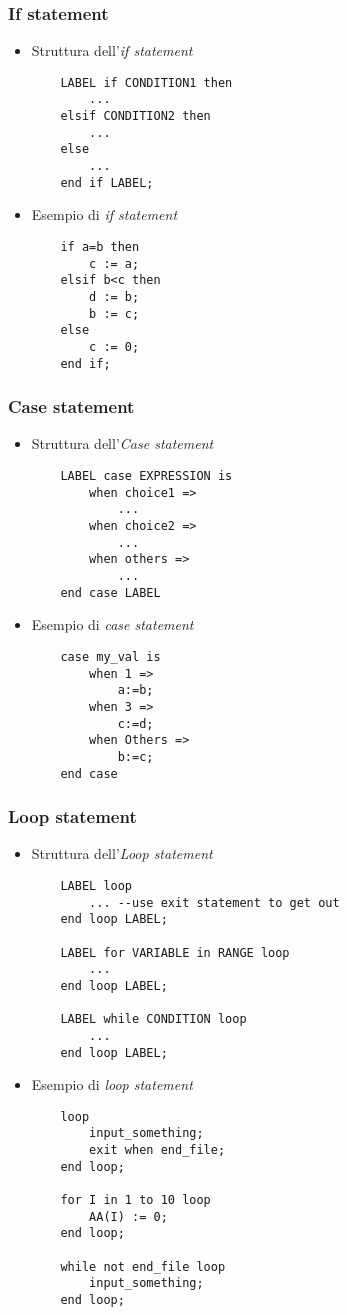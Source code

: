 \documentclass{article}
\begin{document}
\subsubsection{If statement}
\begin{itemize}
	\item Struttura dell'\textit{if statement}
	      \begin{verbatim}
    LABEL if CONDITION1 then
        ...
    elsif CONDITION2 then
        ...
    else
        ...
    end if LABEL;
	      \end{verbatim}
	\item Esempio di \textit{if statement}
	      \begin{verbatim}
    if a=b then
        c := a;
    elsif b<c then
        d := b;
        b := c;
    else
        c := 0;
    end if;
	      \end{verbatim}
\end{itemize}
\subsubsection{Case statement}
\begin{itemize}
	\item Struttura dell'\textit{Case statement}
	      \begin{verbatim}
    LABEL case EXPRESSION is
        when choice1 =>
            ...
        when choice2 =>
            ...
        when others =>
            ...
    end case LABEL
	      \end{verbatim}
	\item Esempio di \textit{case statement}
	      \begin{verbatim}
    case my_val is
        when 1 =>
            a:=b;
        when 3 =>
            c:=d;
        when Others =>
            b:=c;
    end case
	      \end{verbatim}
\end{itemize}
\subsubsection{Loop statement}
\begin{itemize}
	\item Struttura dell'\textit{Loop statement}
	      \begin{verbatim}
    LABEL loop
        ... --use exit statement to get out
    end loop LABEL;
    
    LABEL for VARIABLE in RANGE loop
        ...
    end loop LABEL;
    
    LABEL while CONDITION loop
        ...
    end loop LABEL;
	      \end{verbatim}
	\item Esempio di \textit{loop statement}
	      \begin{verbatim}
    loop
        input_something;
        exit when end_file;
    end loop;
    
    for I in 1 to 10 loop
        AA(I) := 0;
    end loop;
    
    while not end_file loop
        input_something;
    end loop;
	      \end{verbatim}
\end{itemize}
\end{document}
